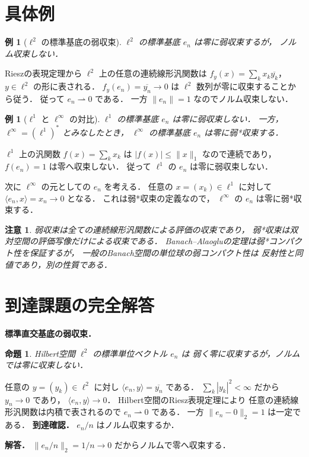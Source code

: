 \documentclass[a5paper,10pt,onecolumn]{jsarticle}
\makeatletter
\theoremstyle{mathnotetheorem}
\newtheorem{proposition}[theorem]{命題}
\newtheorem{example}[theorem]{例}
\newtheorem{remark}[theorem]{注意}
\renewcommand{\proofname}{証明}
\renewenvironment{proof}[1][\proofname]{%
  \par\pushQED{\qed}\normalfont\topsep4\p@\@plus2\p@\relax
  \trivlist\item[\hskip\labelsep\bfseries #1]\ignorespaces
}{\popQED\endtrivlist\@endpefalse}
\newcommand{\norm}[1]{\lVert #1\rVert}
\makeatother
\begin{document}
\section{具体例}

\begin{example}[$\ell^2$ の標準基底の弱収束]
$\ell^2$ の標準基底 $e_n$ は零に弱収束するが，
ノルム収束しない．
\end{example}
\begin{proof}
Rieszの表現定理から
$\ell^2$ 上の任意の連続線形汎関数は
$f_y(x)=\sum_kx_k\overline{y_k}$，
$y\in\ell^2$ の形に表される．
$f_y(e_n)=\overline{y_n}\to0$ は
$\ell^2$ 数列が零に収束することから従う．
従って $e_n\rightharpoonup0$ である．
一方 $\norm{e_n}=1$ なのでノルム収束しない．
\end{proof}

\begin{example}[$\ell^1$ と $\ell^\infty$ の対比]
$\ell^1$ の標準基底 $e_n$ は零に弱収束しない．
一方，$\ell^\infty=(\ell^1)^*$ とみなしたとき，
$\ell^\infty$ の標準基底 $e_n$ は零に弱*収束する．
\end{example}
\begin{proof}
$\ell^1$ 上の汎関数
$f(x)=\sum_kx_k$ は
$|f(x)|\le\norm x_1$ なので連続であり，
$f(e_n)=1$ は零へ収束しない．
従って $\ell^1$ の $e_n$ は零に弱収束しない．

次に $\ell^\infty$ の元としての $e_n$ を考える．
任意の $x=(x_k)\in\ell^1$ に対して
$\langle e_n,x\rangle=x_n\to0$ となる．
これは弱*収束の定義なので，
$\ell^\infty$ の $e_n$ は零に弱*収束する．
\end{proof}

\begin{remark}
弱収束は全ての連続線形汎関数による評価の収束であり，
弱*収束は双対空間の評価写像だけによる収束である．
Banach--Alaogluの定理は弱*コンパクト性を保証するが，
一般のBanach空間の単位球の弱コンパクト性は
反射性と同値であり，別の性質である．
\end{remark}

\section{到達課題の完全解答}
\noindent\textbf{標準直交基底の弱収束．}
\begin{proposition}
Hilbert空間 $\ell^2$ の標準単位ベクトル $e_n$ は
弱く零に収束するが，ノルムでは零に収束しない．
\end{proposition}
\begin{proof}
任意の $y=(y_k)\in\ell^2$ に対し
$\langle e_n,y\rangle=\overline{y_n}$ である．
$\sum_k|y_k|^2<\infty$ だから $y_n\to0$ であり，
$\langle e_n,y\rangle\to0$．
Hilbert空間のRiesz表現定理により
任意の連続線形汎関数は内積で表されるので
$e_n\rightharpoonup0$ である．
一方 $\|e_n-0\|_2=1$ は一定である．
\end{proof}
\noindent\textbf{到達確認．}
$e_n/n$ はノルム収束するか．
\par\noindent\textbf{解答．}
$\|e_n/n\|_2=1/n\to0$ だからノルムで零へ収束する．
\end{document}
